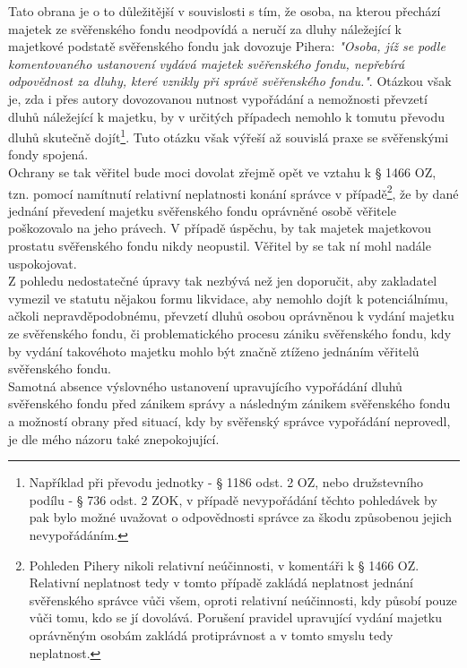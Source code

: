 \documentclass{article}
\begin{document}
Tato obrana je o to důležitější v souvislosti s tím, že osoba, na kterou přechází majetek ze svěřenského fondu neodpovídá a neručí za dluhy náležející k majetkové podstatě svěřenského fondu jak dovozuje Pihera: \textit{"Osoba, jíž se podle komentovaného ustanovení vydává majetek svěřenského fondu, nepřebírá odpovědnost za dluhy, které vznikly při správě svěřenského fondu."}. Otázkou však je, zda i přes autory dovozovanou nutnost vypořádání a nemožnosti převzetí dluhů náležející k majetku, by v určitých případech nemohlo k tomutu převodu dluhů skutečně dojít\footnote{Například při převodu jednotky - § 1186 odst. 2 OZ, nebo družstevního podílu - § 736 odst. 2 ZOK, v případě nevypořádání těchto pohledávek by pak bylo možné uvažovat o odpovědnosti správce za škodu způsobenou jejich nevypořádáním.}. Tuto otázku však výřeší až souvislá praxe se svěřenskými fondy spojená.\\

Ochrany se tak věřitel bude moci dovolat zřejmě opět ve vztahu k § 1466 OZ, tzn. pomocí namítnutí relativní neplatnosti konání správce v případě\footnote{Pohleden Pihery nikoli relativní neúčinnosti, v komentáři k § 1466 OZ. Relativní neplatnost tedy v tomto případě zakládá neplatnost jednání svěřenského správce vůči všem, oproti relativní neúčinnosti, kdy působí pouze vůči tomu, kdo se jí dovolává. Porušení pravidel upravující vydání majetku oprávněným osobám zakládá protiprávnost a v tomto smyslu tedy neplatnost.}, že by dané jednání převedení majetku svěřenského fondu oprávněné osobě věřitele poškozovalo na jeho právech. V případě úspěchu, by tak majetek majetkovou prostatu svěřenského fondu nikdy neopustil. Věřitel by se tak ní mohl nadále uspokojovat.\\

Z pohledu nedostatečné úpravy tak nezbývá než jen doporučit, aby zakladatel vymezil ve statutu nějakou formu likvidace, aby nemohlo dojít k potenciálnímu, ačkoli nepravděpodobnému, převzetí dluhů osobou oprávněnou k vydání majetku ze svěřenského fondu, či problematického procesu zániku svěřenského fondu, kdy by vydání takovéhoto majetku mohlo být značně ztíženo jednáním věřitelů svěřenského fondu.\\

Samotná absence výslovného ustanovení upravujícího vypořádání dluhů svěřenského fondu před zánikem správy a následným zánikem svěřenského fondu a možností obrany před situací, kdy by svěřenský správce vypořádání neprovedl, je dle mého názoru také znepokojující.\\
\end{document}

